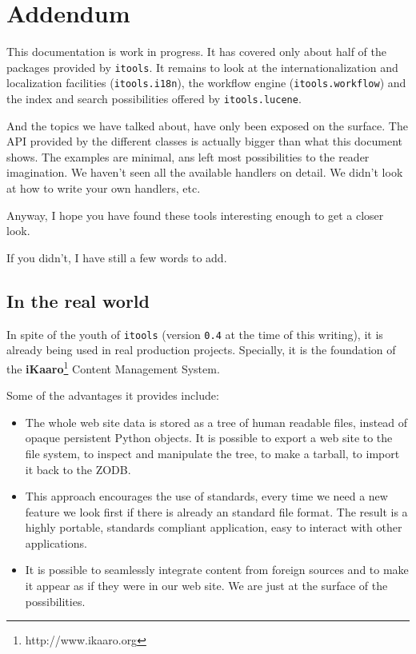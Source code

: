 \chapter{Addendum}

This documentation is work in progress. It has covered only about half of
the packages provided by {\tt itools}. It remains to look at the
internationalization and localization facilities ({\tt itools.i18n}), the
workflow engine ({\tt itools.workflow}) and the index and search
possibilities offered by {\tt itools.lucene}.

And the topics we have talked about, have only been exposed on the surface.
The API provided by the different classes is actually bigger than what this
document shows. The examples are minimal, ans left most possibilities to
the reader imagination. We haven't seen all the available handlers on detail.
We didn't look at how to write your own handlers, etc.

Anyway, I hope you have found these tools interesting enough to get a closer
look.

If you didn't, I have still a few words to add.


\section{In the real world}

In spite of the youth of {\tt itools} (version {\tt 0.4} at the time of this
writing), it is already being used in real production projects. Specially,
it is the foundation of the {\bf iKaaro}\footnote{http://www.ikaaro.org}
Content Management System.

Some of the advantages it provides include:

\begin{itemize}
  \item The whole web site data is stored as a tree of human readable
    files, instead of opaque persistent Python objects. It is possible
    to export a web site to the file system, to inspect and manipulate
    the tree, to make a tarball, to import it back to the ZODB.

  \item This approach encourages the use of standards, every time we
    need a new feature we look first if there is already an standard
    file format. The result is a highly portable, standards compliant
    application, easy to interact with other applications.

  \item It is possible to seamlessly integrate content from foreign
    sources and to make it appear as if they were in our web site.
    We are just at the surface of the possibilities.
\end{itemize}

